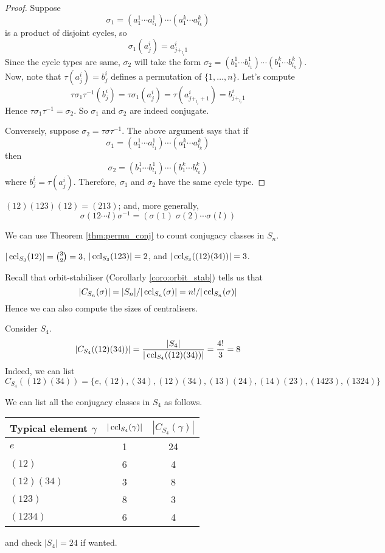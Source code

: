\documentclass[10pt, a4paper, twoside]{report}
\begin{document}
\begin{proof}
    Suppose \[\sigma_1=(a_1^1\cdots a_{l_1}^1)\cdots(a_1^k\cdots a_{l_k}^k)\] is a product of disjoint cycles, so \[\sigma_1(a_j^i)=a_{j+_{l_i}1}^i\] Since the cycle types are same, \(\sigma_2\) will take the form \(\sigma_2=(b_1^1\cdots b_{l_1}^1)\cdots(b_1^k\cdots b_{l_k}^k)\). Now, note that \(\tau(a_j^i)=b_j^i\) defines a permutation of \(\{1,\ldots,n\}\). Let's compute 
    \[\tau\sigma_1\tau^{-1}(b_j^i)=\tau\sigma_1(a_j^i)=\tau(a_{j+_{l_i}+1}^i)=b_{j+_{l_i}1}^i\]
    Hence \(\tau\sigma_1\tau^{-1}=\sigma_2\). So \(\sigma_1\) and \(\sigma_2\) are indeed conjugate.

    Conversely, suppose \(\sigma_2=\tau\sigma\tau^{-1}\). The above argument says that if \[\sigma_1=(a_1^1\cdots a_{l_1}^1)\cdots(a_1^k\cdots a_{l_k}^k)\] then 
    \[\sigma_2=(b_1^1\cdots b_{l_1}^1)\cdots(b_1^k\cdots b_{l_k}^k)\]
    where \(b_j^i=\tau(a_j^i)\). Therefore, \(\sigma_1\) and \(\sigma_2\) have the same cycle type.
\end{proof}
\begin{example}
    \((12)(123)(12)=(213)\); and, more generally, 
    \[\sigma(12\cdots l)\sigma^{-1}=\left(\sigma(1)\;\sigma(2)\cdots\sigma(l)\right)\]
\end{example}
We can use Theorem \ref{thm:permu_conj} to count conjugacy classes in \(S_n\).
\begin{example}
    \(|\operatorname{ccl}_{S_3}(12)|=\binom 32=3\), \(|\operatorname{ccl}_{S_3}(123)|=2\), and \(|\operatorname{ccl}_{S_3}((12)(34))|=3\).
\end{example}
Recall that orbit-stabiliser (Corollarly \ref{coro:orbit_stab}) tells us that 
\[|C_{S_n}(\sigma)|=|S_n|/|\operatorname{ccl}_{S_n}(\sigma)|=n!/|\operatorname{ccl}_{S_n}(\sigma)|\]
Hence we can also compute the sizes of centralisers.
\begin{example} Consider \(S_4\).
    \[|C_{S_4}((12)(34))|=\frac{|S_4|}{|\operatorname{ccl}_{S_4}((12)(34))|}=\frac{4!}{3}=8\]
    Indeed, we can list 
    \[C_{S_4}((12)(34))=\{e,(12),(34),(12)(34),(13)(24),(14)(23),(1423),(1324)\}\]
\end{example}
\begin{example}
    We can list all the conjugacy classes in \(S_4\) as follows.
    \begin{table}[H]
        \centering
        \begin{tabularx}{0.6\textwidth}{Xcc}
            \toprule
            Typical element \(\gamma\) & \(|\operatorname{ccl}_{S_4}(\gamma)|\) & \(|C_{S_4}(\gamma)|\) \\
            \midrule
            \(e\) & 1 & 24 \\
            \((12)\) & 6 & 4 \\
            \((12)(34)\) & 3 & 8 \\
            \((123)\) & 8 & 3 \\
            \((1234)\) & 6 & 4 \\
            \bottomrule 
        \end{tabularx}
    \end{table}
    and check \(|S_4|=24\) if wanted.
    \label{eg:conj_s4}
\end{example}
\end{document}
